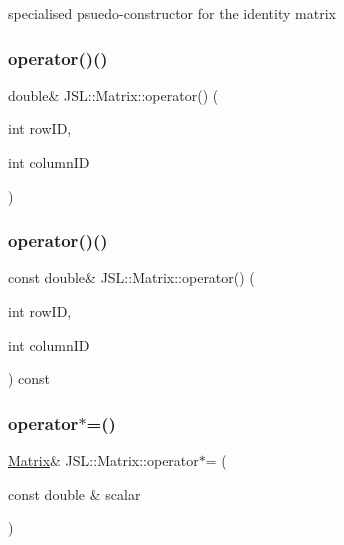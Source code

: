 specialised psuedo-\/constructor for the identity matrix 

\mbox{\label{classJSL_1_1Matrix_a23d8192e8a00d213693b82b3caeb0ceb}} 
\subsubsection{\texorpdfstring{operator()()}{operator()()}\hspace{0.1cm}{\footnotesize\ttfamily [1/2]}}
{\footnotesize\ttfamily double\& J\+S\+L\+::\+Matrix\+::operator() (\begin{DoxyParamCaption}\item[{int}]{row\+ID,  }\item[{int}]{column\+ID }\end{DoxyParamCaption})\hspace{0.3cm}{\ttfamily [inline]}}

\mbox{\label{classJSL_1_1Matrix_ab5dd212faa491611c31288644db66a60}} 
\subsubsection{\texorpdfstring{operator()()}{operator()()}\hspace{0.1cm}{\footnotesize\ttfamily [2/2]}}
{\footnotesize\ttfamily const double\& J\+S\+L\+::\+Matrix\+::operator() (\begin{DoxyParamCaption}\item[{int}]{row\+ID,  }\item[{int}]{column\+ID }\end{DoxyParamCaption}) const\hspace{0.3cm}{\ttfamily [inline]}}

\mbox{\label{classJSL_1_1Matrix_a3d9d4857ed227d7c6db87814f15af2ea}} 
\subsubsection{\texorpdfstring{operator$\ast$=()}{operator*=()}\hspace{0.1cm}{\footnotesize\ttfamily [1/2]}}
{\footnotesize\ttfamily \hyperlink{classJSL_1_1Matrix}{Matrix}\& J\+S\+L\+::\+Matrix\+::operator$\ast$= (\begin{DoxyParamCaption}\item[{const double \&}]{scalar }\end{DoxyParamCaption})\hspace{0.3cm}{\ttfamily [inline]}}



